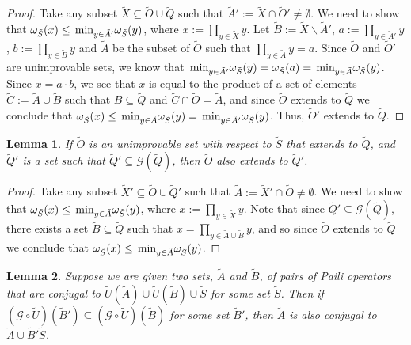 \documentclass[twocolumn,showpacs,preprintnumbers,amsmath,amssymb,nofootinbib,pra,floatfix]{revtex4-1}
\newtheorem{lemma}{Lemma}
\newcommand{\set}{\tilde}
\newcommand{\genfun}{\mathcal{G}}
\begin{document}
\begin{proof}
Take any subset $\set X \subseteq \set O\cup\set Q$ such that $\set A' := \set X\cap \set O' \ne \emptyset$.  We need to show that $\om_{\set S}(x)\le\min_{y\in\set A'}\om_{\set S}(y)$, where $x := \prod_{y\in\set X} y$.  Let $\set B := \set X \backslash \set A'$, $a := \prod_{y\in\set A'} y$, $b := \prod_{y\in\set B} y$ and $\set A$ be the subset of $\set O$ such that $\prod_{y\in\set A} y =a$.  Since $\set O$ and $\set O'$ are unimprovable sets, we know that $\min_{y\in\set A'}\om_{\set S}(y)=\om_{\set S}(a)=\min_{y\in\set A}\om_{\set S}(y)$.  Since $x=a\cdot b$, we see that $x$ is equal to the product of a set of elements $\set C := \set A \cup\set B$ such that $B\subseteq \set Q$ and $\set C\cap\set O=\set A$, and since $\set O$ extends to $\set Q$ we conclude that $\om_{\set S}(x)\le\min_{y\in\set A}\om_{\set S}(y)=\min_{y\in\set A'}\om_{\set S}(y)$.  Thus, $\set O'$ extends to $\set Q$.
\end{proof}
\begin{lemma}
\label{recombining extension elements preserves extension}
If $\set O$ is an unimprovable set with respect to $\set S$ that extends to $\set Q$, and $\set Q'$ is a set such that $\set Q'\subseteq\genfun(\set Q)$, then $\set O$ also extends to $\set Q'$.
\end{lemma}

\begin{proof}
Take any subset $\set X' \subseteq \set O\cup\set Q'$ such that $\set A := \set X'\cap \set O \ne \emptyset$.  We need to show that $\om_{\set S}(x)\le\min_{y\in\set A}\om_{\set S}(y)$, where $x := \prod_{y\in\set X} y$.  Note that since $\set Q'\subseteq\genfun(\set Q)$, there exists a set $\set B\subseteq \set Q$ such that $x = \prod_{y\in\set A\cup\set B} y$, and so since $\set O$ extends to $\set Q$ we conclude that $\om_{\set S}(x)\le\min_{y\in\set A}\om_{\set S}(y)$.
\end{proof}
\begin{lemma}
\label{recombining elements preserves conjugal property for third parties}
Suppose we are given two sets, $\set A$ and $\set B$, of pairs of Paili operators that are conjugal to $\set U(\set A) \cup \set U(\set B) \cup \set S$ for some set $\set S$.  Then if $(\genfun\circ \set U)(\set B')\subseteq(\genfun\circ \set U)(\set B)$ for some set $\set B'$, then $\set A$ is also conjugal to $\set A \cup \set B' \set S$.
\end{lemma}
\end{document}
